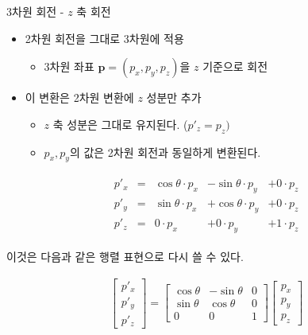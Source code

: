 \begin{frame}[fragile]{3차원 회전 - $z$ 축 회전}

\begin{itemize}
\item 2차원 회전을 그대로 3차원에 적용
	\begin{itemize}
	\item 3차원 좌표 $\mathbf p = (p_x, p_y, p_z)$을 $z$ 기준으로 회전
	\end{itemize}
\item 이 변환은 2차원 변환에 $z$ 성분만 추가
	\begin{itemize}
	\item $z$ 축 성분은 그대로 유지된다. ($p'_z = p_z)$
	\item $p_x, p_y$의 값은 2차원 회전과 동일하게 변환된다.
	\end{itemize}
\end{itemize}

\begin{eqnarray}
\begin{array}{clrrr} 
p'_x  & = &\cos \theta \cdot p_x &- \sin \theta \cdot p_y &+ 0 \cdot p_z \\
p'_y  & = &\sin \theta \cdot p_x &+ \cos \theta \cdot p_y &+ 0 \cdot p_z \\
p'_z  & = & 0 \cdot p_x &+ 0 \cdot p_y &+ 1 \cdot p_z
\end{array} \nonumber
\end{eqnarray}

이것은 다음과 같은 행렬 표현으로 다시 쓸 수 있다.

\begin{eqnarray}
\left [ \begin{array}{c} p'_x \\ p'_y \\ p'_z  \end{array} \right ] 
=
\left [ \begin{array}{rrr}
\cos \theta &- \sin \theta  & 0  \\
\sin \theta & \cos \theta  & 0 \\
0 & 0  & 1 
\end{array} \right ]
\left [ \begin{array}{c} p_x \\ p_y \\ p_z \end{array} \right ]  \nonumber
\end{eqnarray}


\end{frame}


